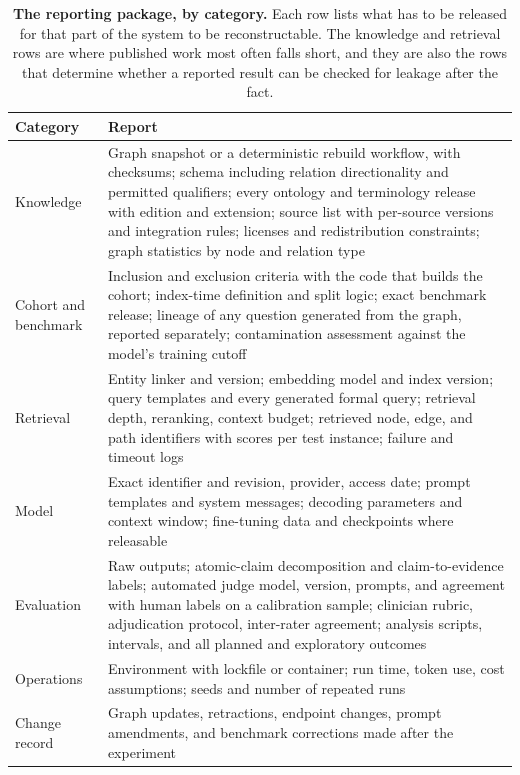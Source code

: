 \documentclass[10pt,a4paper]{article}
\begin{document}
\begin{table}[!ht]
\centering
\caption{\textbf{The reporting package, by category.} Each row lists what has to be released for that
part of the system to be reconstructable. The knowledge and retrieval rows are where published work most
often falls short, and they are also the rows that determine whether a reported result can be checked
for leakage after the fact.}
\label{tab:sreport}
\footnotesize
\begin{tabularx}{\textwidth}{@{}L{2.5cm} Y@{}}
\toprule
\textbf{Category} & \textbf{Report} \\
\midrule
Knowledge & Graph snapshot or a deterministic rebuild workflow, with checksums; schema including relation directionality and permitted qualifiers; every ontology and terminology release with edition and extension; source list with per-source versions and integration rules; licenses and redistribution constraints; graph statistics by node and relation type \\
Cohort and benchmark & Inclusion and exclusion criteria with the code that builds the cohort; index-time definition and split logic; exact benchmark release; lineage of any question generated from the graph, reported separately; contamination assessment against the model's training cutoff \\
Retrieval & Entity linker and version; embedding model and index version; query templates and every generated formal query; retrieval depth, reranking, context budget; retrieved node, edge, and path identifiers with scores per test instance; failure and timeout logs \\
Model & Exact identifier and revision, provider, access date; prompt templates and system messages; decoding parameters and context window; fine-tuning data and checkpoints where releasable \\
Evaluation & Raw outputs; atomic-claim decomposition and claim-to-evidence labels; automated judge model, version, prompts, and agreement with human labels on a calibration sample; clinician rubric, adjudication protocol, inter-rater agreement; analysis scripts, intervals, and all planned and exploratory outcomes \\
Operations & Environment with lockfile or container; run time, token use, cost assumptions; seeds and number of repeated runs \\
Change record & Graph updates, retractions, endpoint changes, prompt amendments, and benchmark corrections made after the experiment \\
\bottomrule
\end{tabularx}
\end{table}
\end{document}
